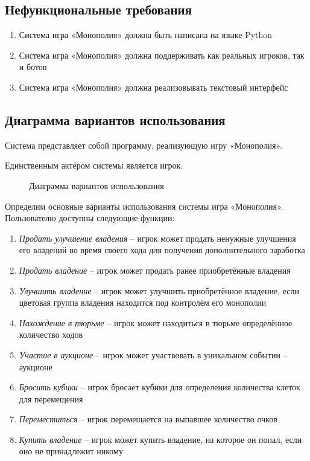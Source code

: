 \begin{Large}
\subsection{Нефункциональные требования}
\begin{spacing}{0.9}
\begin{enumerate}
    \item Система игра «Монополия» должна быть написана на языке Python 
    \item Система игра «Монополия» должна поддерживать как реальных игроков, так и ботов
    \item Система игра «Монополия» должна реализовывать текстовый интерфейс
\end{enumerate}
\end{spacing}
\subsection{Диаграмма вариантов использования}
Система представляет собой программу, реализующую игру «Монополия».

Единственным актёром системы является игрок.
\begin{figure}[h!]
    \caption{Диаграмма вариантов использования}
\end{figure}

Определим основные варианты использования системы игра «Монополия». Пользователю доступны следующие функции:
\begin{enumerate}
    \item \textit{Продать улучшение владения} – игрок может продать ненужные улучшения его владений во время своего хода для получения дополнительного заработка
    \item \textit{Продать владение} – игрок может продать ранее приобретённые владения
    \item \textit{Улучшить владение} – игрок может улучшить приобретённое владение, если цветовая группа владения находится под контролём его монополии
    \item \textit{Нахождение в тюрьме} – игрок может находиться в тюрьме определённое количество ходов
    \item \textit{Участие в аукционе} – игрок может участвовать в уникальном событии – аукционе
    \item \textit{Бросить кубики} – игрок бросает кубики для определения количества клеток для перемещения
    \item \textit{Переместиться} – игрок перемещается на выпавшее количество очков
    \item \textit{Купить владение} – игрок может купить владение, на которое он попал, если оно не принадлежит никому
\end{enumerate}

\end{Large}
